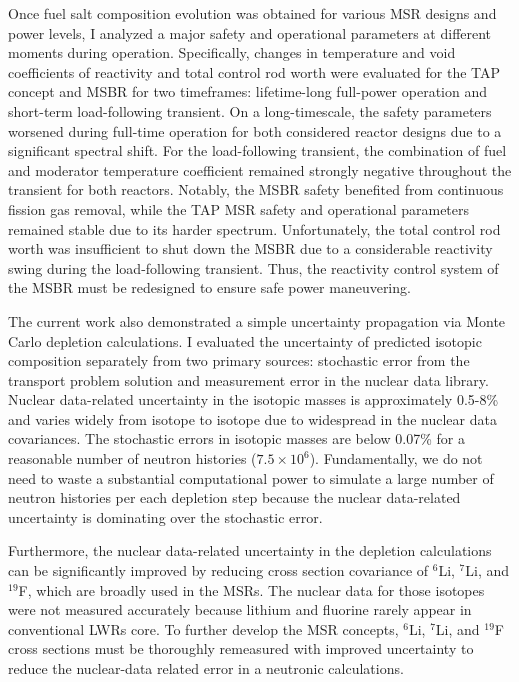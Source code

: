 Once fuel salt composition evolution was obtained for various \gls{MSR} 
designs and power levels, I analyzed a major safety and operational parameters 
at different moments during operation. Specifically, changes in temperature 
and void coefficients of reactivity and total control rod worth were evaluated 
for the \gls{TAP} concept and \gls{MSBR} for two timeframes: lifetime-long 
full-power operation and short-term load-following transient. On a 
long-timescale, the safety parameters worsened during full-time operation for 
both considered reactor designs due to a significant spectral shift. For the 
load-following transient, the combination of fuel and moderator temperature 
coefficient remained strongly negative throughout the transient for both 
reactors. Notably, the \gls{MSBR} safety benefited from continuous fission gas 
removal, while the \gls{TAP} \gls{MSR} safety and operational parameters 
remained stable due to its harder spectrum. Unfortunately, the total control 
rod worth was insufficient to shut down the \gls{MSBR} due to a considerable 
reactivity swing during the load-following transient. Thus, the reactivity 
control system of the \gls{MSBR} must be redesigned to ensure safe power 
maneuvering.

The current work also demonstrated a simple uncertainty propagation via Monte 
Carlo depletion calculations. I evaluated the uncertainty of predicted 
isotopic composition separately from two primary sources: stochastic error 
from the transport problem solution and measurement error in the nuclear data 
library. Nuclear data-related uncertainty in the isotopic masses is 
approximately 0.5-8\% and varies widely from isotope to isotope due to 
widespread in the nuclear data covariances. The stochastic errors in isotopic 
masses are below 0.07\% for a reasonable number of neutron histories 
($7.5\times 10^6$). Fundamentally, we do not need to waste a substantial 
computational power to simulate a large number of neutron histories per each 
depletion step because the nuclear data-related uncertainty is dominating over 
the stochastic error. 

Furthermore, the nuclear data-related uncertainty in the 
depletion calculations can be significantly improved by reducing cross section 
covariance of $^{6}$Li, $^{7}$Li, and $^{19}$F, which are broadly used in the 
\glspl{MSR}. The nuclear data for those isotopes were not measured accurately 
because lithium and fluorine rarely appear in conventional \glspl{LWR} 
core. To further develop the \gls{MSR} concepts, $^{6}$Li, $^{7}$Li, and 
$^{19}$F cross sections must be thoroughly remeasured with improved 
uncertainty to reduce the nuclear-data related error in a neutronic 
calculations.



